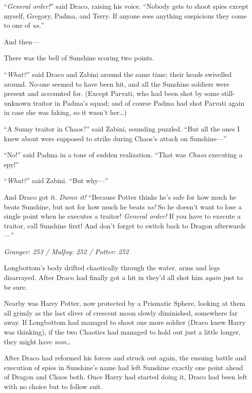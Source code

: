 “\emph{General order!}” said Draco, raising his voice. “Nobody gets to shoot spies except myself, Gregory, Padma, and Terry. If anyone sees anything suspicious they come to one of \emph{us.}”

And then—

There was the bell of Sunshine scoring two points.

“\emph{What?}” said Draco and Zabini around the same time; their heads swivelled around. No-one seemed to have been hit, and all the Sunshine soldiers were present and accounted for. (Except Parvati, who had been shot by some still-unknown traitor in Padma’s squad; and of course Padma had shot Parvati again in case she was faking, so it wasn’t her…)

“A Sunny traitor in Chaos?” said Zabini, sounding puzzled. “But all the ones I knew about were supposed to strike during Chaos’s attack on Sunshine—”

“No!” said Padma in a tone of sudden realization. “That was \emph{Chaos} executing a spy!”

“\emph{What?}” said Zabini. “But why—”

And Draco got it. \emph{Damn it!} “Because Potter thinks he’s safe for how much he beats Sunshine, but not for how much he beats \emph{us!} So he doesn’t want to lose a single point when he executes a traitor! \emph{General order!} If you have to execute a traitor, call Sunshine first! And don’t forget to switch back to Dragon afterwards—”

\later

\emph{Granger: 253 / Malfoy: 252 / Potter: 252}

Longbottom’s body drifted chaotically through the water, arms and legs disarrayed. After Draco had finally got a hit in they’d all shot him \emph{again} just to be sure.

Nearby was Harry Potter, now protected by a Prismatic Sphere, looking at them all grimly as the last sliver of crescent moon slowly diminished, somewhere far away. If Longbottom had managed to shoot one more soldier (Draco knew Harry was thinking), if the two Chaotics had managed to hold out just a little longer, they might have \emph{won}…

After Draco had reformed his forces and struck out again, the ensuing battle and execution of spies in Sunshine’s name had left Sunshine exactly one point ahead of Dragon and Chaos both. Once Harry had started doing it, Draco had been left with no choice but to follow suit.

